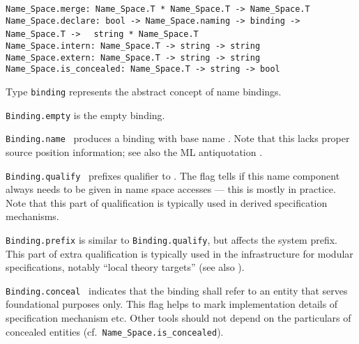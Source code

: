 \begin{isabellebody}
\begin{isamarkuptext}
\begin{mldecls}
  \verb|Name_Space.merge: Name_Space.T * Name_Space.T -> Name_Space.T| \\
  \verb|Name_Space.declare: bool -> Name_Space.naming -> binding -> Name_Space.T ->|\isasep\isanewline%
\verb|  string * Name_Space.T| \\
  \verb|Name_Space.intern: Name_Space.T -> string -> string| \\
  \verb|Name_Space.extern: Name_Space.T -> string -> string| \\
  \verb|Name_Space.is_concealed: Name_Space.T -> string -> bool|
  \end{mldecls}

  \begin{description}

  \item Type \verb|binding| represents the abstract concept of
  name bindings.

  \item \verb|Binding.empty| is the empty binding.

  \item \verb|Binding.name|~ produces a binding with base
  name .  Note that this lacks proper source position
  information; see also the ML antiquotation \hyperlink{ML antiquotation.binding}{\mbox{}}.

  \item \verb|Binding.qualify|~
  prefixes qualifier  to .  The  flag tells if this name component always needs to be
  given in name space accesses --- this is mostly  in
  practice.  Note that this part of qualification is typically used in
  derived specification mechanisms.

  \item \verb|Binding.prefix| is similar to \verb|Binding.qualify|, but
  affects the system prefix.  This part of extra qualification is
  typically used in the infrastructure for modular specifications,
  notably ``local theory targets'' (see also ).

  \item \verb|Binding.conceal|~ indicates that the
  binding shall refer to an entity that serves foundational purposes
  only.  This flag helps to mark implementation details of
  specification mechanism etc.  Other tools should not depend on the
  particulars of concealed entities (cf.\ \verb|Name_Space.is_concealed|).


\end{description}
\end{isamarkuptext}
\end{isabellebody}
